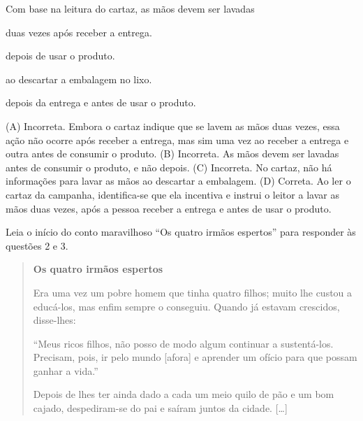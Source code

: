 Com base na leitura do cartaz, as mãos devem ser lavadas

\begin{escolha}
\item duas vezes após receber a entrega.

\item depois de usar o produto.

\item ao descartar a embalagem no lixo.

\item depois da entrega e antes de usar o produto.
\end{escolha}


(A) Incorreta. Embora o cartaz indique que se lavem as mãos duas vezes,
essa ação não ocorre após receber a entrega, mas sim uma vez ao receber
a entrega e outra antes de consumir o produto.
(B) Incorreta. As mãos devem ser lavadas antes de consumir o produto, e
não depois.
(C) Incorreta. No cartaz, não há informações para lavar as mãos ao descartar a embalagem.
(D) Correta. Ao ler o cartaz da campanha, identifica-se que ela
incentiva e instrui o leitor a lavar as mãos duas vezes, após a pessoa
receber a entrega e antes de usar o produto.

Leia o início do conto maravilhoso ``Os quatro irmãos espertos'' para responder às questões 2 e 3.

\begin{quote}
\textbf{Os quatro irmãos espertos}

Era uma vez um pobre homem que tinha quatro filhos; muito lhe custou a
educá-los, mas enfim sempre o conseguiu. Quando já estavam crescidos,
disse-lhes:

``Meus ricos filhos, não posso de modo algum continuar a sustentá-los.
Precisam, pois, ir pelo mundo [afora] e aprender um ofício para que possam
ganhar a vida.''

Depois de lhes ter ainda dado a cada um meio quilo de pão e um bom
cajado, despediram-se do pai e saíram juntos da cidade. {[}\ldots{}{]}

\end{quote}

